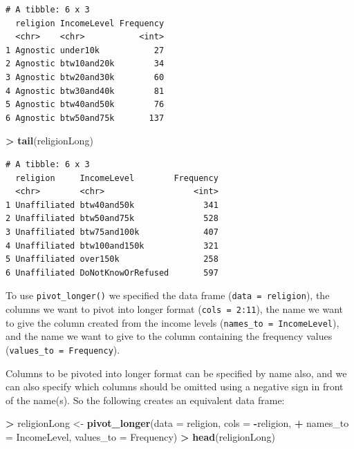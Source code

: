 \documentclass[
]{krantz}
\makeatletter
\newenvironment{Shaded}{\begin{snugshade}}{\end{snugshade}}
\newcommand{\DataTypeTok}[1]{\textcolor[rgb]{0.27,0.27,0.27}{#1}}
\newcommand{\KeywordTok}[1]{\textcolor[rgb]{0.27,0.27,0.27}{\textbf{#1}}}
\newcommand{\NormalTok}[1]{#1}
\newcommand{\OperatorTok}[1]{\textcolor[rgb]{0.43,0.43,0.43}{\textbf{#1}}}
\newcommand{\StringTok}[1]{\textcolor[rgb]{0.5,0.5,0.5}{#1}}
\newenvironment{kframe}{%
\medskip{}
\setlength{\fboxsep}{.8em}
 \def\at@end@of@kframe{}%
 \ifinner\ifhmode%
  \def\at@end@of@kframe{\end{minipage}}%
  \begin{minipage}{\columnwidth}%
 \fi\fi%
 \def\FrameCommand##1{\hskip\@totalleftmargin \hskip-\fboxsep
 \colorbox{shadecolor}{##1}\hskip-\fboxsep
     \hskip-\linewidth \hskip-\@totalleftmargin \hskip\columnwidth}%
 \MakeFramed {\advance\hsize-\width
   \@totalleftmargin\z@ \linewidth\hsize
   \@setminipage}}%
 {\par\unskip\endMakeFramed%
 \at@end@of@kframe}
\renewenvironment{Shaded}{\begin{kframe}}{\end{kframe}}
\makeatother
\begin{document}
\begin{verbatim}
# A tibble: 6 x 3
  religion IncomeLevel Frequency
  <chr>    <chr>           <int>
1 Agnostic under10k           27
2 Agnostic btw10and20k        34
3 Agnostic btw20and30k        60
4 Agnostic btw30and40k        81
5 Agnostic btw40and50k        76
6 Agnostic btw50and75k       137
\end{verbatim}

\begin{Shaded}
\begin{Highlighting}[]
\OperatorTok{\textgreater{}}\StringTok{ }\KeywordTok{tail}\NormalTok{(religionLong)}
\end{Highlighting}
\end{Shaded}

\begin{verbatim}
# A tibble: 6 x 3
  religion     IncomeLevel        Frequency
  <chr>        <chr>                  <int>
1 Unaffiliated btw40and50k              341
2 Unaffiliated btw50and75k              528
3 Unaffiliated btw75and100k             407
4 Unaffiliated btw100and150k            321
5 Unaffiliated over150k                 258
6 Unaffiliated DoNotKnowOrRefused       597
\end{verbatim}

To use \texttt{pivot\_longer()} we specified the data frame (\texttt{data\ =\ religion}), the columns we want to pivot into longer format (\texttt{cols\ =\ 2:11}), the name we want to give the column created from the income levels (\texttt{names\_to\ =\ \textquotesingle{}IncomeLevel\textquotesingle{}}), and the name we want to give to the column containing the frequency values (\texttt{values\_to\ =\ \textquotesingle{}Frequency\textquotesingle{}}).

Columns to be pivoted into longer format can be specified by name also, and we can also specify which columns should be omitted using a negative sign in front of the name(s). So the following creates an equivalent data frame:

\begin{Shaded}
\begin{Highlighting}[]
\OperatorTok{\textgreater{}}\StringTok{ }\NormalTok{religionLong \textless{}{-}}\StringTok{ }\KeywordTok{pivot\_longer}\NormalTok{(}\DataTypeTok{data =}\NormalTok{ religion, }\DataTypeTok{cols =} \OperatorTok{{-}}\NormalTok{religion, }
\OperatorTok{+}\StringTok{                    }\DataTypeTok{names\_to =} \StringTok{\textquotesingle{}IncomeLevel\textquotesingle{}}\NormalTok{, }\DataTypeTok{values\_to =} \StringTok{\textquotesingle{}Frequency\textquotesingle{}}\NormalTok{) }
\OperatorTok{\textgreater{}}\StringTok{ }\KeywordTok{head}\NormalTok{(religionLong)}
\end{Highlighting}
\end{Shaded}
\end{document}
